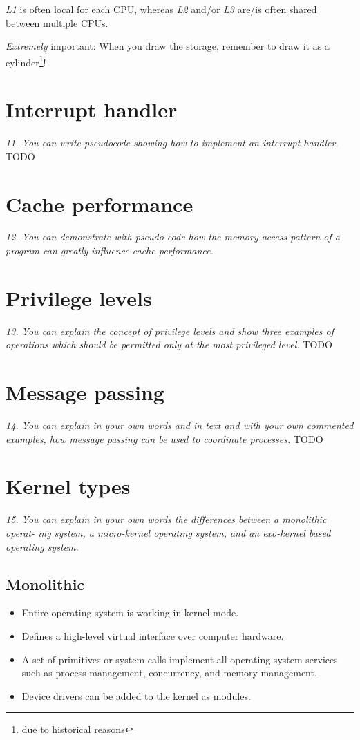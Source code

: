 \documentclass{article}
\begin{document}
\emph{L1} is often local for each CPU, whereas \emph{L2} and/or \emph{L3} are/is often shared between multiple CPUs.

\emph{Extremely} important: When you draw the storage, remember to draw it as a cylinder\footnote{due to historical reasons}!


\section{Interrupt handler}
\emph{11. You can write pseudocode showing how to implement an interrupt handler.}
TODO


\section{Cache performance}
\emph{12. You can demonstrate with pseudo code how the memory access pattern of a program can greatly influence cache performance.}



\section{Privilege levels}
\emph{13. You can explain the concept of privilege levels and show three examples of operations which should be permitted only at the most privileged level.}
TODO


\section{Message passing}
\emph{14. You can explain in your own words and in text and with your own commented examples, how message passing can be used to coordinate processes.}
TODO


\section{Kernel types}
\emph{15. You can explain in your own words the differences between a monolithic operat-
ing system, a micro-kernel operating system, and an exo-kernel based operating
system.}

\subsection{Monolithic}
\begin{itemize}
\item Entire operating system is working in kernel mode.
\item Defines a high-level virtual interface over computer hardware.
\item A set of primitives or system calls implement all operating system services such as process management, concurrency, and memory management.
\item Device drivers can be added to the kernel as modules.
\end{itemize}
\end{document}
